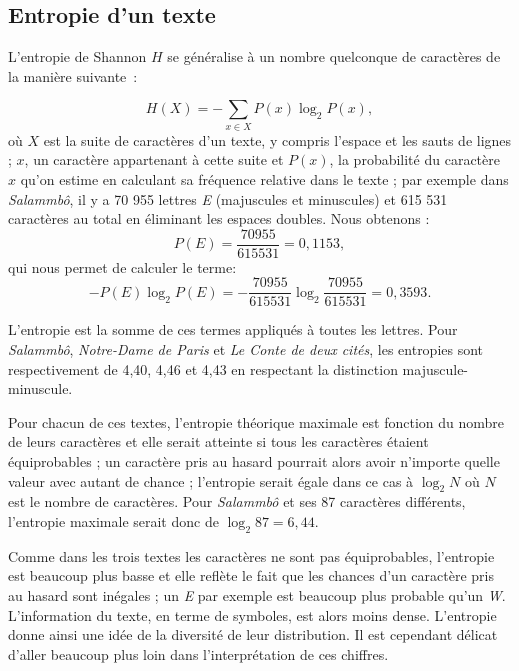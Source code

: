 \documentclass[]{article}
\begin{document}
\subsection{Entropie d'un texte}
L'entropie de Shannon $H$ se généralise à un nombre quelconque de caractères de la manière suivante~:

\[
H(X) = - \sum\limits_{x \in X} {P(x)\log _2 P(x)},
\]
où $X$ est la suite de caractères d'un texte, y compris l'espace et les sauts de lignes ; $x$, un caractère appartenant à cette suite et $P(x)$, la probabilité du caractère $x$ qu'on estime en calculant sa fréquence relative dans le texte ; par exemple dans \textit{Salammbô}, il y a 70 955 lettres \textit{E} (majuscules et minuscules) et 615 531 caractères au total en éliminant les espaces doubles. Nous obtenons :
\[
P(E) = \frac{70 955}{615 531} = 0,1153,
\]
qui nous permet de calculer le terme: 
 \[
 - P(E) \log_2 P(E) = - \frac{70 955}{615 531} \log_2 \frac{70 955}{615 531} = 0,3593.
 \]
 
L'entropie est la somme de ces termes appliqués à toutes les lettres.  Pour \textit{Salammbô}, \textit{Notre-Dame de Paris} et \textit{Le Conte de deux cités}, les entropies sont respectivement de 4,40, 4,46 et 4,43 en respectant la distinction majuscule-minuscule.


Pour chacun de ces textes, l'entropie théorique maximale est fonction du nombre de leurs caractères et elle serait atteinte si tous les caractères étaient équiprobables ; un caractère pris au hasard pourrait alors avoir n'importe quelle valeur avec autant de chance ; l'entropie serait égale dans ce cas  à $\log_2 N$ où $N$ est le nombre de caractères. Pour \textit{Salammbô} et ses 87 caractères différents, l'entropie maximale serait donc de $\log_2 87 = 6,44$.

Comme dans les trois textes les caractères ne sont pas équiprobables, l'entropie est beaucoup plus basse et elle reflète le fait que les chances d'un caractère pris au hasard  sont inégales ; un \textit{E} par exemple est beaucoup plus probable qu'un \textit{W}. L'information du texte, en terme de symboles, est alors moins dense. L'entropie donne ainsi une idée de la diversité de leur distribution. Il est cependant délicat d'aller beaucoup plus loin dans l'interprétation de ces chiffres. 
\end{document}
